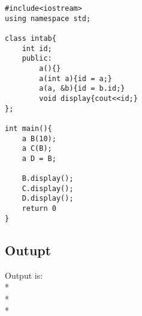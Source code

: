 \begin{lstlisting}
#include<iostream>
using namespace std;

class intab{
	int id;
	public:
		a(){}
		a(int a){id = a;}
		a(a, &b){id = b.id;}
		void display{cout<<id;}
};	

int main(){
	a B(10);
	a C(B);
	a D = B;
	
	B.display();
	C.display();
	D.display();
	return 0
}

\end{lstlisting}
\subsection{Outupt}
Output is:  
\\* 
\\* 
\\* 

